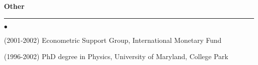 \documentclass[11pt]{article}
\begin{document}
\noindent
\large\textsf{\textbf {Other}}

\vspace*{-8pt}
\noindent
\rule{165mm}{0.25mm}
\normalfont\normalsize
\vspace*{-12pt}
\begin{list}{$\bullet$}
   {\setlength{\itemsep}{0ex}
    \setlength{\parsep}{1ex}} 
    \item (2001-2002) Econometric Support Group, International
      Monetary Fund
    \item (1996-2002) PhD degree in Physics, University of Maryland,
      College Park   
\end{list}
\end{document}
